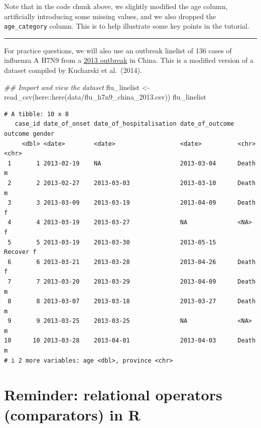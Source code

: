 \documentclass[
  letterpaper,
  DIV=11,
  numbers=noendperiod]{scrreprt}
\newenvironment{Shaded}{\begin{snugshade}}{\end{snugshade}}
\newcommand{\DocumentationTok}[1]{\textcolor[rgb]{0.37,0.37,0.37}{\textit{#1}}}
\newcommand{\FunctionTok}[1]{\textcolor[rgb]{0.28,0.35,0.67}{#1}}
\newcommand{\NormalTok}[1]{\textcolor[rgb]{0.00,0.23,0.31}{#1}}
\newcommand{\OtherTok}[1]{\textcolor[rgb]{0.00,0.23,0.31}{#1}}
\newcommand{\SpecialCharTok}[1]{\textcolor[rgb]{0.37,0.37,0.37}{#1}}
\newcommand{\StringTok}[1]{\textcolor[rgb]{0.13,0.47,0.30}{#1}}
\begin{document}
Note that in the code chunk above, we slightly modified the age column,
artificially introducing some missing values, and we also dropped the
\texttt{age\_category} column. This is to help illustrate some key
points in the tutorial.

\begin{center}\rule{0.5\linewidth}{0.5pt}\end{center}

For practice questions, we will also use an outbreak linelist of 136
cases of influenza A H7N9 from a
\href{https://en.wikipedia.org/wiki/Influenza_A_virus_subtype_H7N9\#Reported_cases_in_2013}{2013
outbreak} in China. This is a modified version of a dataset compiled by
Kucharski et al.~(2014).

\begin{Shaded}
\begin{Highlighting}[]
\DocumentationTok{\#\# Import and view the dataset}
\NormalTok{flu\_linelist }\OtherTok{\textless{}{-}} \FunctionTok{read\_csv}\NormalTok{(here}\SpecialCharTok{::}\FunctionTok{here}\NormalTok{(}\StringTok{\textquotesingle{}data/flu\_h7n9\_china\_2013.csv\textquotesingle{}}\NormalTok{))}
\NormalTok{flu\_linelist}
\end{Highlighting}
\end{Shaded}

\begin{verbatim}
# A tibble: 10 x 8
   case_id date_of_onset date_of_hospitalisation date_of_outcome outcome gender
     <dbl> <date>        <date>                  <date>          <chr>   <chr> 
 1       1 2013-02-19    NA                      2013-03-04      Death   m     
 2       2 2013-02-27    2013-03-03              2013-03-10      Death   m     
 3       3 2013-03-09    2013-03-19              2013-04-09      Death   f     
 4       4 2013-03-19    2013-03-27              NA              <NA>    f     
 5       5 2013-03-19    2013-03-30              2013-05-15      Recover f     
 6       6 2013-03-21    2013-03-28              2013-04-26      Death   f     
 7       7 2013-03-20    2013-03-29              2013-04-09      Death   m     
 8       8 2013-03-07    2013-03-18              2013-03-27      Death   m     
 9       9 2013-03-25    2013-03-25              NA              <NA>    m     
10      10 2013-03-28    2013-04-01              2013-04-03      Death   m     
# i 2 more variables: age <dbl>, province <chr>
\end{verbatim}

\section{Reminder: relational operators (comparators) in
R}\label{reminder-relational-operators-comparators-in-r}
\end{document}

